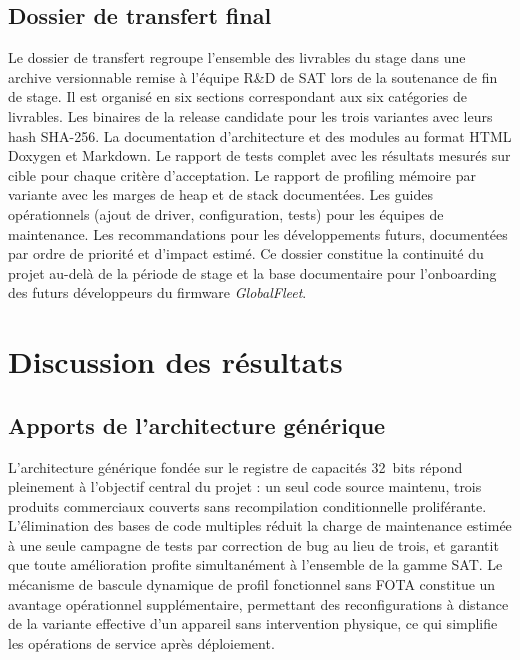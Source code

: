\subsection{Dossier de transfert final}
\label{subsec:doc_transfer}

Le dossier de transfert regroupe l'ensemble des livrables du stage
dans une archive versionnable remise à l'équipe R\&D de SAT lors de
la soutenance de fin de stage. Il est organisé en six sections
correspondant aux six catégories de livrables. Les binaires de la
release candidate pour les trois variantes avec leurs hash SHA-256.
La documentation d'architecture et des modules au format HTML Doxygen
et Markdown. Le rapport de tests complet avec les résultats mesurés
sur cible pour chaque critère d'acceptation. Le rapport de profiling
mémoire par variante avec les marges de heap et de stack documentées.
Les guides opérationnels (ajout de driver, configuration, tests) pour
les équipes de maintenance. Les recommandations pour les développements
futurs, documentées par ordre de priorité et d'impact estimé. Ce
dossier constitue la continuité du projet au-delà de la période de
stage et la base documentaire pour l'onboarding des futurs développeurs
du firmware \textit{GlobalFleet}.

\section{Discussion des résultats}
\label{sec:discussion}

\subsection*{Apports de l'architecture générique}

L'architecture générique fondée sur le registre de capacités 32~bits
répond pleinement à l'objectif central du projet : un seul code source
maintenu, trois produits commerciaux couverts sans recompilation
conditionnelle proliférante. L'élimination des bases de code multiples
réduit la charge de maintenance estimée à une seule campagne de tests
par correction de bug au lieu de trois, et garantit que toute
amélioration profite simultanément à l'ensemble de la gamme SAT.
Le mécanisme de bascule dynamique de profil fonctionnel sans FOTA
constitue un avantage opérationnel supplémentaire, permettant des
reconfigurations à distance de la variante effective d'un appareil sans
intervention physique, ce qui simplifie les opérations de service après
déploiement.

